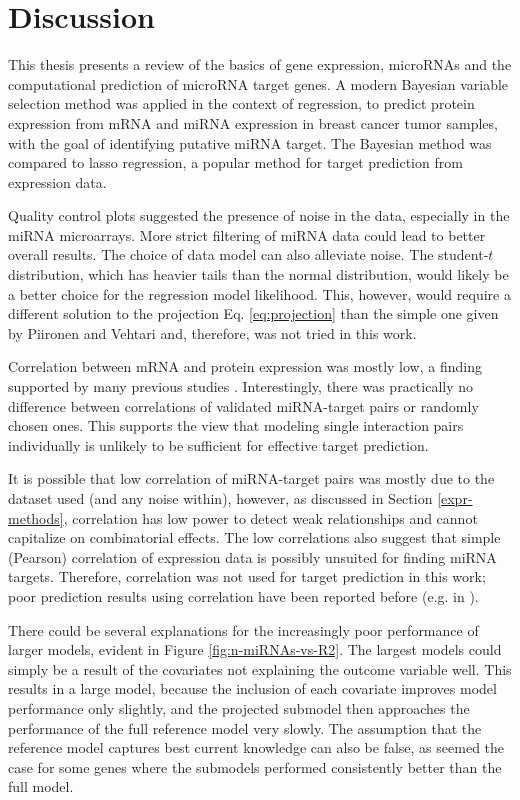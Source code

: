 
\section{Discussion}

This thesis presents a review of the basics of gene expression, microRNAs and
the computational prediction of microRNA target genes. A modern Bayesian
variable selection method was applied in the context of regression, to predict
protein expression from mRNA and miRNA expression in breast cancer tumor
samples, with the goal of identifying putative miRNA target. The Bayesian
method was compared to lasso regression, a popular method for target
prediction from expression data.

Quality control plots suggested the presence of noise in the data, especially
in the miRNA microarrays. More strict filtering of miRNA data could lead to
better overall results. The choice of data model can also alleviate noise. The
student-$t$ distribution, which has heavier tails than the normal
distribution, would likely be a better choice for the regression model
likelihood. This, however, would require a different solution to the
projection Eq. \eqref{eq:projection} than the simple one given by Piironen
and Vehtari \citep{Piironen2015} and, therefore, was not tried in this work.

Correlation between mRNA and protein expression was mostly low, a finding
supported by many previous studies \citep{Payne2015}. Interestingly, there was
practically no difference between correlations of validated miRNA-target pairs
or randomly chosen ones. This supports the view that modeling single
interaction pairs individually is unlikely to be sufficient for effective target
prediction.

It is possible that low correlation of miRNA-target pairs was mostly due to the
dataset used (and any noise within), however, as discussed in Section \ref{expr-methods},
correlation has low power to detect weak relationships and
cannot capitalize on combinatorial effects. The low correlations also suggest
that simple (Pearson) correlation of expression data is possibly unsuited for
finding miRNA targets. Therefore, correlation was not used for target
prediction in this work; poor prediction results using correlation have been
reported before (e.g. in \citep{Muniategui2012}).

There could be several explanations for the increasingly poor performance of
larger models, evident in Figure \ref{fig:n-miRNAs-vs-R2}. The largest models
could simply be a result of the covariates not explaining the outcome variable
well. This results in a large model, because the inclusion of each covariate
improves model performance only slightly, and the projected submodel then
approaches the performance of the full reference model very slowly. The
assumption that the reference model captures best current knowledge can also be
false, as seemed the case for some genes where the submodels performed 
consistently better than the full model.

